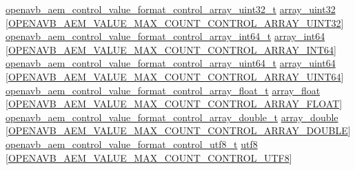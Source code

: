 \begin{DoxyCompactItemize}
\begin{tabbing}
\>\hyperlink{structopenavb__aem__control__value__format__control__array__uint32__t}{openavb\_aem\_control\_value\_format\_control\_array\_uint32\_t} \hyperlink{structopenavb__aem__descriptor__control__t_a0266708555d025c743b64cb5171ea21a}{array\_uint32} \mbox{[}\hyperlink{openavb__aem__types__pub_8h_ad7224058276cef4af09a7bca2a100aa4}{OPENAVB\_AEM\_VALUE\_MAX\_COUNT\_CONTROL\_ARRAY\_UINT32}\mbox{]}\\
\>\hyperlink{structopenavb__aem__control__value__format__control__array__int64__t}{openavb\_aem\_control\_value\_format\_control\_array\_int64\_t} \hyperlink{structopenavb__aem__descriptor__control__t_a64e06c03e4caf17b19fdd385b167a7b1}{array\_int64} \mbox{[}\hyperlink{openavb__aem__types__pub_8h_a12920be22f7684ede9ff63a7f236b3f5}{OPENAVB\_AEM\_VALUE\_MAX\_COUNT\_CONTROL\_ARRAY\_INT64}\mbox{]}\\
\>\hyperlink{structopenavb__aem__control__value__format__control__array__uint64__t}{openavb\_aem\_control\_value\_format\_control\_array\_uint64\_t} \hyperlink{structopenavb__aem__descriptor__control__t_a3479f65fbcce53b28da13e9f05ef0bdf}{array\_uint64} \mbox{[}\hyperlink{openavb__aem__types__pub_8h_ac7bb9f9163809af43c5c663890ee8421}{OPENAVB\_AEM\_VALUE\_MAX\_COUNT\_CONTROL\_ARRAY\_UINT64}\mbox{]}\\
\>\hyperlink{structopenavb__aem__control__value__format__control__array__float__t}{openavb\_aem\_control\_value\_format\_control\_array\_float\_t} \hyperlink{structopenavb__aem__descriptor__control__t_a302cd501df357dce616052e01855002e}{array\_float} \mbox{[}\hyperlink{openavb__aem__types__pub_8h_a9b5279d703bc9980f1563e407ab9e883}{OPENAVB\_AEM\_VALUE\_MAX\_COUNT\_CONTROL\_ARRAY\_FLOAT}\mbox{]}\\
\>\hyperlink{structopenavb__aem__control__value__format__control__array__double__t}{openavb\_aem\_control\_value\_format\_control\_array\_double\_t} \hyperlink{structopenavb__aem__descriptor__control__t_a3f70f76246682a07514a2216ef2ff656}{array\_double} \mbox{[}\hyperlink{openavb__aem__types__pub_8h_af9b2e1db2cf7d955068f95622ed4c129}{OPENAVB\_AEM\_VALUE\_MAX\_COUNT\_CONTROL\_ARRAY\_DOUBLE}\mbox{]}\\
\>\hyperlink{structopenavb__aem__control__value__format__control__utf8__t}{openavb\_aem\_control\_value\_format\_control\_utf8\_t} \hyperlink{structopenavb__aem__descriptor__control__t_af9843d2779f8c09b422a4b9707b2fc39}{utf8} \mbox{[}\hyperlink{openavb__aem__types__pub_8h_a5f28bd9fb3c4c9c407c5a72c843d7c54}{OPENAVB\_AEM\_VALUE\_MAX\_COUNT\_CONTROL\_UTF8}\mbox{]}\\

\end{tabbing}
\end{DoxyCompactItemize}
